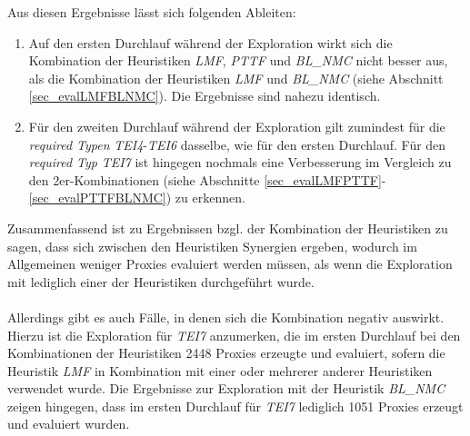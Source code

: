 \begin{multicols}{2}
\columnbreak
{}
\end{multicols}
\noindent
Aus diesen Ergebnisse lässt sich folgenden Ableiten:
\begin{enumerate}
\item Auf den ersten Durchlauf während der Exploration wirkt sich die Kombination der Heuristiken \emph{LMF}, \emph{PTTF} und \emph{BL\_NMC} nicht besser aus, als die Kombination der Heuristiken \emph{LMF} und \emph{BL\_NMC} (siehe Abschnitt \ref{sec_evalLMFBLNMC}). Die Ergebnisse sind nahezu identisch.
\item Für den zweiten Durchlauf während der Exploration gilt zumindest für die \emph{required Typen} \emph{TEI4}-\emph{TEI6} dasselbe, wie für den ersten Durchlauf. Für den \emph{required Typ} \emph{TEI7} ist hingegen nochmals eine Verbesserung im Vergleich zu den 2er-Kombinationen (siehe Abschnitte \ref{sec_evalLMFPTTF}-\ref{sec_evalPTTFBLNMC}) zu erkennen.
\end{enumerate}
\noindent
Zusammenfassend ist zu Ergebnissen bzgl. der Kombination der Heuristiken zu sagen, dass sich zwischen den Heuristiken Synergien ergeben, wodurch im Allgemeinen weniger Proxies evaluiert werden müssen, als wenn die Exploration mit lediglich einer der Heuristiken durchgeführt wurde. 
\\\\
Allerdings gibt es auch Fälle, in denen sich die Kombination negativ auswirkt.   Hierzu ist die Exploration für \emph{TEI7} anzumerken, die im ersten Durchlauf  bei den Kombinationen der Heuristiken 2448 Proxies erzeugte und evaluiert, sofern die Heuristik \emph{LMF} in Kombination mit einer oder mehrerer anderer Heuristiken verwendet wurde. Die Ergebnisse zur Exploration mit der Heuristik \emph{BL\_NMC} zeigen hingegen, dass im ersten Durchlauf für \emph{TEI7} lediglich 1051 Proxies erzeugt und evaluiert wurden. 